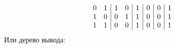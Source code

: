 \begin{enumerate}
\begin{solution}
\begin{displaymath}
\begin{array}{c c|c c|c|c|c|c}
        0 & 1 & 1 & 0 & 1 & 0 & 0 & 1\\
        1 & 0 & 0 & 1 & 1 & 0 & 0 & 1\\
        1 & 1 & 0 & 0 & 1 & 0 & 0 & 1\\
      \end{array}
    \end{displaymath}
    Или дерево вывода:
    \begin{prooftree}
    \end{prooftree}
  \end{solution}
\end{enumerate}
\clearpage
